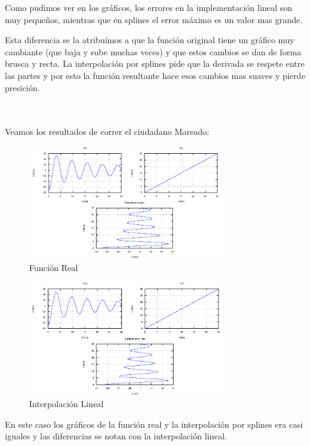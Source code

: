 \documentclass[a4paper,10pt]{article}
\begin{document}
\par Como pudimos ver en los gráficos, los errores en la implementación lineal son muy pequeños, mientras que en splines el error máximo es un valor mas grande.

\par Esta diferencia se la atribuímos a que la función original tiene un gráfico muy cambiante (que baja y sube muchas veces) y que estos cambios se dan de forma brusca y recta. La interpolación por splines pide que la derivada se respete entre las partes y por esto la función resultante hace esos cambios mas suaves y pierde presición. \\
\\
\\
\par Veamos los resultados de correr el ciudadano Mareado:

\FloatBarrier
\begin{figure}[h]
  \centering
    \includegraphics[width=0.75\textwidth]{imagenes/Mareado_Real.png}
  \caption{Función Real}
\end{figure}
\FloatBarrier
\begin{figure}[h]
  \centering
    \includegraphics[width=0.75\textwidth]{imagenes/Mareado_Lineal.png}
  \caption{Interpolación Lineal}
\end{figure}
\FloatBarrier

\par En este caso los gráficos de la función real y la interpolación por splines era casi iguales y las diferencias se notan con la interpolación lineal.
\end{document}
